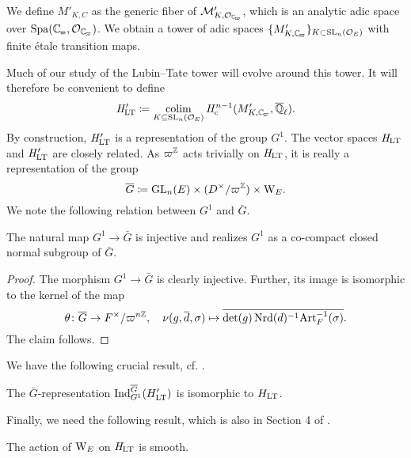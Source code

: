 \documentclass[../main.tex]{subfiles}
\begin{document}
We define $M'_{K, C}$ as the generic fiber of $\cM'_{K, \cO_\Cp}$, which is 
an analytic adic space over $\spa(\Cp,\allowbreak \cO_\Cp)$. We obtain a tower
of adic spaces
$\{M'_{K, \Cp}\}_{K \subset \SL_n(\cO_E)}$ with finite \'etale transition maps. 

Much of our study of the Lubin--Tate tower will evolve around
this tower. It will therefore be convenient to define 
\begin{equation*}
  \HLT' \coloneqq \colim_{K \subseteq \SL_n(\cO_E)} \hHc^{n-1}(M_{K,\Cp}', \Qlbar).
\end{equation*}
By construction, $\mathit H_{\mathrm{LT}}'$ is a representation of the group $G^1$. 
The vector spaces $\mathit H_{\mathrm{LT}}$ and $\mathit H_{\mathrm{LT}}'$ are closely related. 
As $\varpi^{\mathbb{Z}}$ acts trivially on $\mathit H_{\mathrm{LT}}$, it is really a representation of the group
\begin{equation*}
  \overline G \coloneqq \operatorname{GL}_n(E) \times (D^\times/\varpi^{\mathbb{Z}}) \times \mathrm W_E.
\end{equation*}
We note the following relation between $G^1$ and $\bar G$.
\begin{lem}\label{lem:G1subG}
  The natural map $G^1 \to \bar G$ is injective and realizes $G^1$ as a co-compact closed
  normal subgroup of $\bar G$.
\begin{proof}
  The morphism $G^1 \to \bar G$ is clearly injective. Further, its image is
  isomorphic to the kernel of the map 
  \begin{equation*}
   \theta \colon \overline G \to F^\times/\varpi^{n\mathbb{Z}}, \quad \nu(g, \overline d, \sigma) \mapsto 
 \overline{\det(g)\operatorname{Nrd}(d)^{-1}\mathrm{Art}_F^{-1}(\sigma)}.
  \end{equation*}
  The claim follows.
\end{proof}
\end{lem}

We have the following crucial result, cf. \cite[Section 4]{mieda2016geometric}.
\begin{prop}\label{lem:InductionStatementOnHLT}
  The $\bar G$-representation $\mathrm{Ind}_{G^1}^{\overline G} (H'_{\mathrm{LT}})$ is isomorphic to $H_{\mathrm{LT}}$. 
\end{prop}

Finally, we need the following result, which is also in Section 4 of
\cite{mieda2016geometric}.
\begin{lem}\label{lem:GActsSmoothlyOnHLT}
  The action of $\mathrm W_E$ on $\mathit H_{\mathrm{LT}}$ is smooth.
\end{lem}



\end{document}
